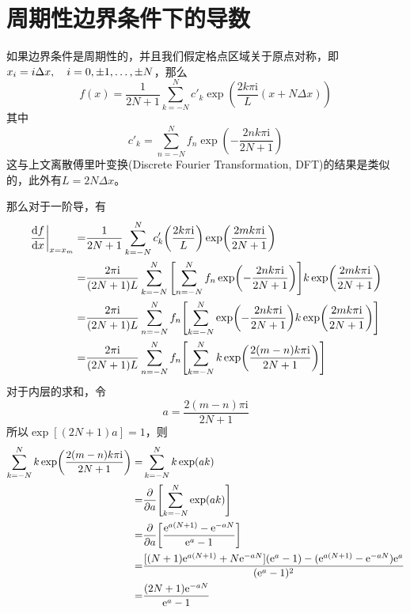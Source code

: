 \documentclass[UTF8,12pt]{article}
\begin{document}
    \section{周期性边界条件下的导数}
        如果边界条件是周期性的，并且我们假定格点区域关于原点对称，即$x_i=i\Delta x\qc i=0,\pm 1,\dots,\pm N$，那么
        \begin{equation}
            f(x)=\frac{1}{2N+1}\sum_{k=-N}^N{c'_k}\exp(\frac{2k\pi\mathrm{i}}{L}(x+N\Delta x))
        \end{equation}
        其中
        \begin{equation}
            c'_k=\sum_{n=-N}^N{f_n\exp(-\frac{2nk\pi\mathrm{i}}{2N+1})}
        \end{equation}
        这与上文离散傅里叶变换(Discrete Fourier Transformation, DFT)的结果是类似的，此外有$L=2N\Delta x$。\par
        那么对于一阶导，有
        \begin{align}
            \eval{\dv{f}{x}}_{x=x_m}=&\frac{1}{2N+1}\sum_{k=-N}^N{c'_k\qty(\frac{2k\pi\mathrm{i}}{L})\exp(\frac{2mk\pi\mathrm{i}}{2N+1})} \\
            =&\frac{2\pi\mathrm{i}}{(2N+1)L}\sum_{k=-N}^N{\qty[\sum_{n=-N}^N{f_n\exp(-\frac{2nk\pi\mathrm{i}}{2N+1})}]k\exp(\frac{2mk\pi\mathrm{i}}{2N+1})} \\
            =&\frac{2\pi\mathrm{i}}{(2N+1)L}\sum_{n=-N}^N{f_n\qty[\sum_{k=-N}^N{\exp(-\frac{2nk\pi\mathrm{i}}{2N+1})k\exp(\frac{2mk\pi\mathrm{i}}{2N+1})}]} \\
            =&\frac{2\pi\mathrm{i}}{(2N+1)L}\sum_{n=-N}^N{f_n\qty[\sum_{k=-N}^N{k\exp(\frac{2(m-n)k\pi\mathrm{i}}{2N+1})}]}
        \end{align}
        对于内层的求和，令
        \begin{equation}
            a=\frac{2(m-n)\pi\mathrm{i}}{2N+1}
        \end{equation}
        所以$\exp[(2N+1)a]=1$，则
        \begin{align}
            \sum_{k=-N}^N{k\exp(\frac{2(m-n)k\pi\mathrm{i}}{2N+1})}=&\sum_{k=-N}^N{k\exp(ak)} \\
            =&\pdv{a} \qty[\sum_{k=-N}^N{\exp(ak)}] \\
            =&\pdv{a} \qty[\frac{\mathrm{e}^{a(N+1)}-\mathrm{e}^{-aN}}{\mathrm{e}^{a}-1}] \\
            =&\frac{[(N+1)\mathrm{e}^{a(N+1)}+N\mathrm{e}^{-aN}](\mathrm{e}^{a}-1)-(\mathrm{e}^{a(N+1)}-\mathrm{e}^{-aN})\mathrm{e}^{a}}{(\mathrm{e}^{a}-1)^2} \\
            =&\frac{(2N+1)\mathrm{e}^{-aN}}{\mathrm{e}^{a}-1}
        \end{align}
\end{document}
